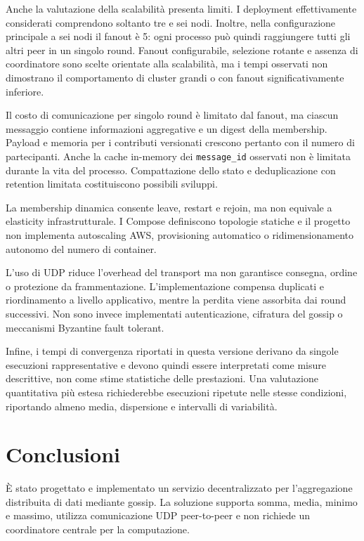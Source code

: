 \documentclass[conference]{IEEEtran}
\begin{document}
Anche la valutazione della scalabilità presenta limiti. I deployment effettivamente considerati comprendono soltanto tre e sei nodi. Inoltre, nella configurazione principale a sei nodi il fanout è 5: ogni processo può quindi raggiungere tutti gli altri peer in un singolo round. Fanout configurabile, selezione rotante e assenza di coordinatore sono scelte orientate alla scalabilità, ma i tempi osservati non dimostrano il comportamento di cluster grandi o con fanout significativamente inferiore.

Il costo di comunicazione per singolo round è limitato dal fanout, ma ciascun messaggio contiene informazioni aggregative e un digest della membership. Payload e memoria per i contributi versionati crescono pertanto con il numero di partecipanti. Anche la cache in-memory dei \texttt{message\_id} osservati non è limitata durante la vita del processo. Compattazione dello stato e deduplicazione con retention limitata costituiscono possibili sviluppi.

La membership dinamica consente leave, restart e rejoin, ma non equivale a elasticity infrastrutturale. I Compose definiscono topologie statiche e il progetto non implementa autoscaling AWS, provisioning automatico o ridimensionamento autonomo del numero di container.

L'uso di UDP riduce l'overhead del transport ma non garantisce consegna, ordine o protezione da frammentazione. L'implementazione compensa duplicati e riordinamento a livello applicativo, mentre la perdita viene assorbita dai round successivi. Non sono invece implementati autenticazione, cifratura del gossip o meccanismi Byzantine fault tolerant.

Infine, i tempi di convergenza riportati in questa versione derivano da singole esecuzioni rappresentative e devono quindi essere interpretati come misure descrittive, non come stime statistiche delle prestazioni. Una valutazione quantitativa più estesa richiederebbe esecuzioni ripetute nelle stesse condizioni, riportando almeno media, dispersione e intervalli di variabilità.

\section{Conclusioni}

È stato progettato e implementato un servizio decentralizzato per l'aggregazione distribuita di dati mediante gossip. La soluzione supporta somma, media, minimo e massimo, utilizza comunicazione UDP peer-to-peer e non richiede un coordinatore centrale per la computazione.
\end{document}
